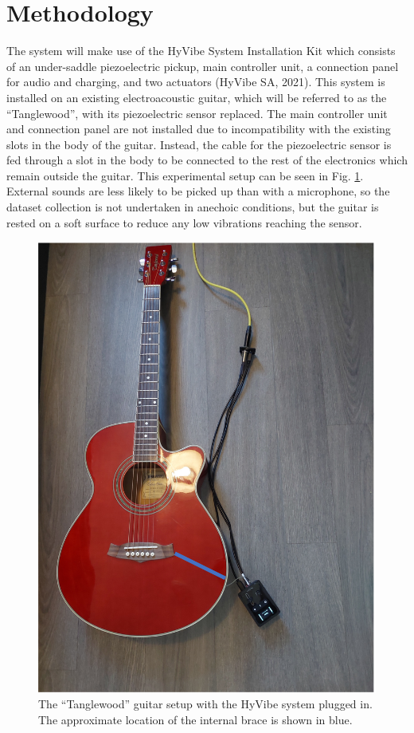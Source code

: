 \documentclass[conference]{IEEEtran}
\begin{document}
\section{Methodology}
The system will make use of the HyVibe System Installation Kit which consists of an under-saddle piezoelectric pickup, main controller unit, a connection panel for audio and charging, and two actuators (HyVibe SA, 2021).
This system is installed on an existing electroacoustic guitar, which will be referred to as the ``Tanglewood'', with its piezoelectric sensor replaced. The main controller unit and connection panel are not installed due to incompatibility with the existing slots in
the body of the guitar. Instead, the cable for the piezoelectric sensor is fed through a slot in the body to be connected to the rest of the electronics which remain outside the guitar. This experimental setup can be
seen in Fig. \ref{tanglewood-setup}. External sounds are less likely to be picked up than with a microphone, so the dataset collection is not undertaken in anechoic conditions, but the guitar is rested on a soft surface to reduce any low
vibrations reaching the sensor.

\begin{figure}[htbp]
    \centerline{\includegraphics[scale=0.4]{tanglewood-setup.png}}
    \caption{The ``Tanglewood'' guitar setup with the HyVibe system plugged in. The approximate location of the internal brace is shown in blue.}
    \label{tanglewood-setup}
    \end{figure}
\end{document}
